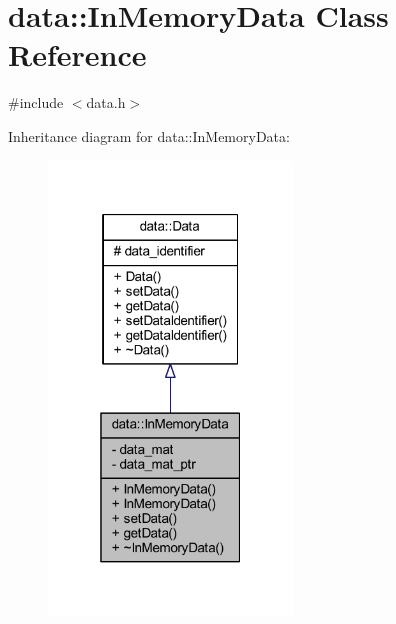 \hypertarget{classdata_1_1_in_memory_data}{}\section{data\+:\+:In\+Memory\+Data Class Reference}
\label{classdata_1_1_in_memory_data}


{\ttfamily \#include $<$data.\+h$>$}



Inheritance diagram for data\+:\+:In\+Memory\+Data\+:\nopagebreak
\begin{figure}[H]
\begin{center}
\leavevmode
\includegraphics[width=184pt]{classdata_1_1_in_memory_data__inherit__graph}
\end{center}
\end{figure}


